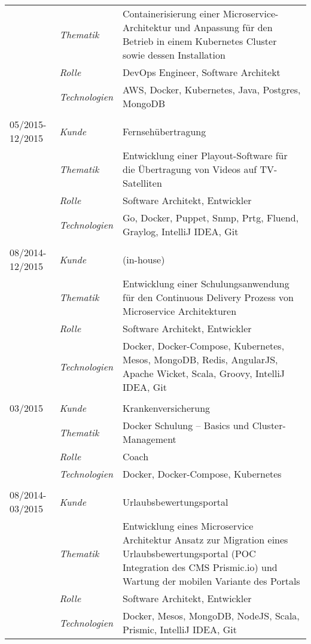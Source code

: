 \begin{longtable}{@{}>{}p{4cm}>{\itshape}p{2cm}>{}p{9cm}}
\nopagebreak		& Thematik	    & Containerisierung einer Microservice-Architektur und Anpassung für den Betrieb in einem Kubernetes Cluster sowie dessen Installation\\
\nopagebreak		& Rolle 	    & DevOps Engineer, Software Architekt\\
\nopagebreak		& Technologien	& AWS, Docker, Kubernetes, Java, Postgres, MongoDB\\
\\
05/2015-12/2015     & Kunde 	    & Fernsehübertragung\\
\nopagebreak		& Thematik	    & Entwicklung einer Playout-Software für die Übertragung von Videos auf TV-Satelliten\\
\nopagebreak		& Rolle 	    & Software Architekt, Entwickler\\
\nopagebreak		& Technologien	& Go, Docker, Puppet, Snmp, Prtg, Fluend, Graylog, IntelliJ IDEA, Git\\
\\
08/2014-12/2015     & Kunde 	    & (in-house)\\
\nopagebreak		& Thematik	    & Entwicklung einer Schulungsanwendung für den Continuous Delivery Prozess von Microservice Architekturen\\
\nopagebreak		& Rolle 	    & Software Architekt, Entwickler\\
\nopagebreak		& Technologien	& Docker, Docker-Compose, Kubernetes, Mesos, MongoDB, Redis, AngularJS, Apache Wicket, Scala, Groovy, IntelliJ IDEA, Git\\
\\
03/2015             & Kunde 	    & Krankenversicherung\\
\nopagebreak		& Thematik	    & Docker Schulung – Basics und Cluster-Management\\
\nopagebreak		& Rolle 	    & Coach\\
\nopagebreak		& Technologien	& Docker, Docker-Compose, Kubernetes\\
\\
08/2014-03/2015     & Kunde 	    & Urlaubsbewertungsportal\\
\nopagebreak		& Thematik	    & Entwicklung eines Microservice Architektur Ansatz zur Migration eines Urlaubsbewertungsportal (POC Integration des CMS Prismic.io) und Wartung der mobilen Variante des Portals\\
\nopagebreak		& Rolle 	    & Software Architekt, Entwickler\\
\nopagebreak		& Technologien	& Docker, Mesos, MongoDB, NodeJS, Scala, Prismic, IntelliJ IDEA, Git\\

\end{longtable}
